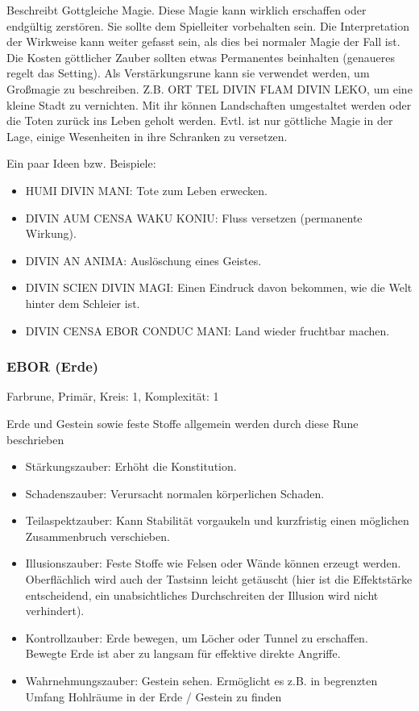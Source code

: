 \documentclass{article}
\begin{document}
Beschreibt Gottgleiche Magie. Diese Magie kann wirklich erschaffen oder endgültig zerstören. Sie sollte dem Spielleiter
vorbehalten sein. Die Interpretation der Wirkweise kann weiter gefasst sein, als dies bei normaler Magie der Fall ist.
Die Kosten göttlicher Zauber sollten etwas Permanentes beinhalten (genaueres regelt das Setting). Als Verstärkungsrune
kann sie verwendet werden, um Großmagie zu beschreiben. Z.B. ORT TEL DIVIN FLAM DIVIN LEKO, um eine kleine Stadt zu
vernichten. Mit ihr können Landschaften umgestaltet werden oder die Toten zurück ins Leben geholt werden. Evtl. ist
nur göttliche Magie in der Lage, einige Wesenheiten in ihre Schranken zu versetzen.

Ein paar Ideen bzw. Beispiele:

\begin{itemize}
\item HUMI DIVIN MANI: Tote zum Leben erwecken.
\item DIVIN AUM CENSA WAKU KONIU: Fluss versetzen (permanente Wirkung).
\item DIVIN AN ANIMA: Auslöschung eines Geistes.
\item DIVIN SCIEN DIVIN MAGI: Einen Eindruck davon bekommen, wie die Welt hinter dem Schleier ist.
\item DIVIN CENSA EBOR CONDUC MANI: Land wieder fruchtbar machen.
\end{itemize}

\subsubsection{EBOR (Erde)}

Farbrune, Primär, Kreis: 1, Komplexität: 1

Erde und Gestein sowie feste Stoffe allgemein werden durch diese Rune beschrieben

\begin{itemize}
\item Stärkungszauber: Erhöht die Konstitution.
\item Schadenszauber: Verursacht normalen körperlichen Schaden.
\item Teilaspektzauber: Kann Stabilität vorgaukeln und kurzfristig einen möglichen Zusammenbruch verschieben.
\item Illusionszauber: Feste Stoffe wie Felsen oder Wände können erzeugt werden. Oberflächlich wird auch der Tastsinn leicht getäuscht (hier ist die Effektstärke entscheidend, ein unabsichtliches Durchschreiten der Illusion wird nicht verhindert).
\item Kontrollzauber: Erde bewegen, um Löcher oder Tunnel zu erschaffen. Bewegte Erde ist aber zu langsam für effektive direkte Angriffe.
\item Wahrnehmungszauber: Gestein sehen. Ermöglicht es z.B. in begrenzten Umfang Hohlräume in der Erde / Gestein zu finden
\end{itemize}
\end{document}

